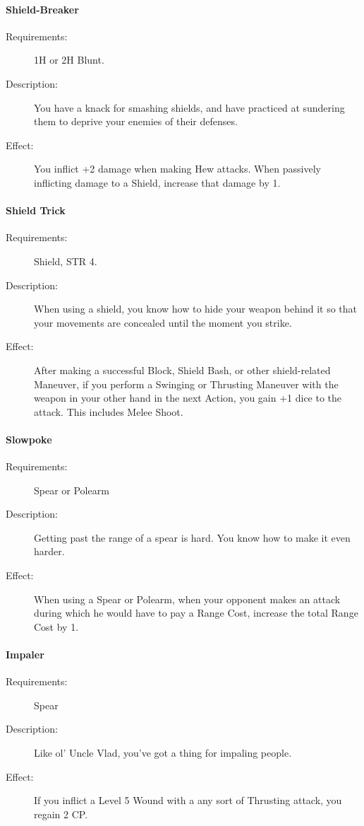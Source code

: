 \documentclass[oneside,11pt,english]{book}
\begin{document}
\paragraph{\label{talent:Shield-Breaker}Shield-Breaker}
\begin{description}
\item [Requirements:] 1H or 2H Blunt. 
\item [Description:] You have a knack for smashing shields, and have practiced at sundering them to deprive 
  your enemies of their defenses. 
\item [Effect:] You inflict +2 damage when making Hew attacks. When passively inflicting damage to a Shield, 
  increase that damage by 1. 
  
\end{description}
\paragraph{\label{talent:Shield Trick}Shield Trick}
\begin{description}
\item [Requirements:] Shield, STR 4. 
\item [Description:] When using a shield, you know how to hide your weapon behind it so that your movements 
  are concealed until the moment you strike. 
\item [Effect:] After making a successful Block, Shield Bash, or other shield-related Maneuver, if you perform a 
  Swinging or Thrusting Maneuver with the weapon in your other hand in the next Action, you gain +1 dice 
  to the attack. This includes Melee Shoot.
  
\end{description}
\paragraph{\label{talent:Slowpoke}Slowpoke}
\begin{description}
\item [Requirements:] Spear or Polearm 
\item [Description:] Getting past the range of a spear is hard. You know how to make it even harder.
\item [Effect:] When using a Spear or Polearm, when your opponent makes an attack during which he would 
  have to pay a Range Cost, increase the total Range Cost by 1. 
  
\end{description}
\paragraph{\label{talent:Impaler}Impaler}
\begin{description}
\item [Requirements:] Spear 
\item [Description:] Like ol’ Uncle Vlad, you’ve got a thing for impaling people. 
\item [Effect:] If you inflict a Level 5 Wound with a any sort of Thrusting attack, you regain 2 CP. 
  
\end{description}
\end{document}
